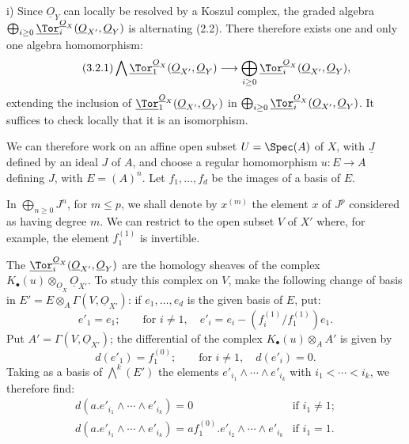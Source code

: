 %
i) Since \(\underline{O}_Y\) can locally be resolved by a Koszul complex, the graded algebra \(\bigoplus_{i\ge0}\underline{\Tor}_i^{\underline{O}_X}(\underline{O}_{X'},\underline{O}_Y)\) is alternating (2.2). There therefore exists one and only one algebra homomorphism:
\begin{equation}\tag{3.2.1}
\bigwedge \underline{\Tor}_1^{\underline{O}_X}(\underline{O}_{X'},\underline{O}_Y)
\longrightarrow
\bigoplus_{i\ge0}\underline{\Tor}_i^{\underline{O}_X}(\underline{O}_{X'},\underline{O}_Y),
\end{equation}
extending the inclusion of \(\underline{\Tor}_1^{\underline{O}_X}(\underline{O}_{X'},\underline{O}_Y)\) in
\(\bigoplus_{i\ge0}\underline{\Tor}_i^{\underline{O}_X}(\underline{O}_{X'},\underline{O}_Y)\). It suffices to check locally that it is an isomorphism.

We can therefore work on an affine open subset \(U=\Spec(A)\) of \(X\), with \(\underline{J}\) defined by an ideal \(J\) of \(A\), and choose a regular homomorphism \(u:E\to A\) defining \(J\), with \(E=(A)^n\). Let \(f_1,\ldots,f_d\) be the images of a basis of \(E\).

In \(\bigoplus_{n\ge0}J^n\), for \(m\le p\), we shall denote by \(x^{(m)}\) the element \(x\) of \(J^p\) considered as having degree \(m\). We can restrict to the open subset \(V\) of \(X'\) where, for example, the element \(f_1^{(1)}\) is invertible.

The \(\underline{\Tor}_i^{\underline{O}_X}(\underline{O}_{X'},\underline{O}_Y)\) are the homology sheaves of the complex \(K_\bullet(u)\otimes_{\underline{O}_X}\underline{O}_{X'}\). To study this complex on \(V\), make the following change of basis in \(E'=E\otimes_A\Gamma(V,\underline{O}_{X'})\): if \(e_1,\ldots,e_d\) is the given basis of \(E\), put:
\[
e'_1=e_1;\qquad \text{for }i\ne1,\quad
e'_i=e_i-(f_i^{(1)}/f_1^{(1)})e_1.
\]
Put \(A'=\Gamma(V,\underline{O}_{X'})\); the differential of the complex \(K_\bullet(u)\otimes_A A'\) is given by
\[
d(e'_1)=f_1^{(0)};\qquad \text{for }i\ne1,\quad d(e'_i)=0.
\]
Taking as a basis of \(\bigwedge^k(E')\) the elements
\(e'_{i_1}\wedge\cdots\wedge e'_{i_k}\) with \(i_1<\cdots<i_k\), we therefore find:
\[
\begin{array}{ll}
d(a.e'_{i_1}\wedge\cdots\wedge e'_{i_k})=0
&\text{if }i_1\ne1;\\[3pt]
d(a.e'_{i_1}\wedge\cdots\wedge e'_{i_k})=
af_1^{(0)}.e'_{i_2}\wedge\cdots\wedge e'_{i_k}
&\text{if }i_1=1.
\end{array}
\]


